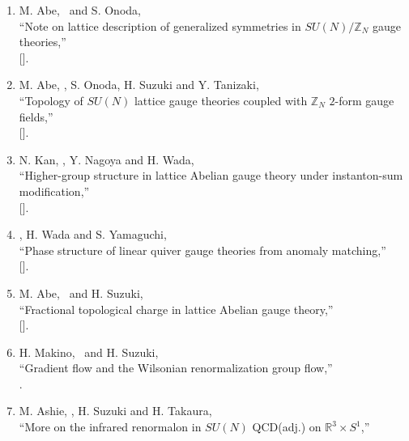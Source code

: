 \begin{enumerate}
       ``Magnetic operators in 2D compact scalar field theories on the lattice,''\\
       [].
 \item M. Abe, \OM\ and S. Onoda,\\
       ``Note on lattice description of generalized symmetries in $SU(N)/\mathbb{Z}_N$ gauge theories,''\\
       [].
 \item M. Abe, \OM, S. Onoda, H. Suzuki and Y. Tanizaki,\\
       ``Topology of $SU(N)$ lattice gauge theories coupled with $\mathbb{Z}_N$ $2$-form gauge fields,''\\
       [].
 \item N. Kan, \OM, Y. Nagoya and H. Wada,\\
       ``Higher-group structure in lattice Abelian gauge theory under instanton-sum modification,''\\
       [].
 \item \OM, H. Wada and S. Yamaguchi,\\
       ``Phase structure of linear quiver gauge theories from anomaly matching,''\\
       [].
 \item M. Abe, \OM\ and H. Suzuki,\\
       ``Fractional topological charge in lattice Abelian gauge theory,''\\
       [].
 \item H. Makino, \OM\ and H. Suzuki,\\
       ``Gradient flow and the Wilsonian renormalization group flow,'' \\
       .
 \item M. Ashie, \OM, H. Suzuki and H. Takaura,\\
       ``More on the infrared renormalon in $SU(N)$ QCD(adj.) on $\mathbb{R}^3\times S^1$,''\\

\end{enumerate}
